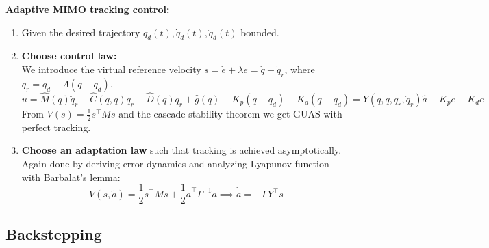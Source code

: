 \begin{tcolorbox}[colback=white, colframe=teal]
    \textbf{Adaptive MIMO tracking control:}
    \begin{enumerate}
        \item Given the desired trajectory $q_d(t), \dot{q}_d(t), \ddot{q}_d(t)$ bounded.
        \item \textbf{Choose control law:}\\
        We introduce the virtual reference velocity $s= \dot{e} + \lambda e = \dot{q} - \dot{q}_r$, where $\dot{q}_{r}=\dot{q}_{d}
        -\Lambda\left(q-q_{d}\right)$.\\
        \begin{equation}
            u=\hat{M}(q) \ddot{q}_{r}+\hat{C}(q, \dot{q}) \dot{q}_{r}+\hat{D}(q) \dot{q}_{r}+\hat{g}(q)-K_{p}\left(q-q_{d}\right)-K_{d}\left(\dot{q}-\dot{q}_{d}\right) = Y\left(q, \dot{q}, \dot{q}_{r}, \ddot{q}_{r}\right) \hat{a}-K_{p} e-K_{d} \dot{e}
        \end{equation}
        From $V(s)= \frac{1}{2} s^{\top}Ms$ and the cascade stability theorem we get GUAS with perfect tracking.
        \item \textbf{Choose an adaptation law} such that tracking is achieved asymptotically. Again done by deriving error dynamics and analyzing Lyapunov function with Barbalat's lemma:
        \begin{equation}
            V(s, \tilde{a}) = \frac{1}{2} s^{\top}Ms + \frac{1}{2} \tilde{a}^{\top}\Gamma^{-1}\tilde{a} \implies \dot{\tilde{a}} = - \Gamma Y^{\top}s
        \end{equation}
        
    \end{enumerate}
\end{tcolorbox}

\subsection{Backstepping}


